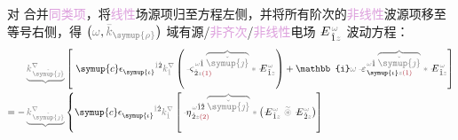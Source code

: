 对  合并\textcolor{Plum}{同类项}，将\textcolor{Plum}{线性}场源项归至方程左侧，并将所有阶次的\textcolor{Plum}{非线性}波源项移至等号右侧，得 $\left( \mathcolor{gray}{\omega}, \mathcolor{gray}{\bar{k}_{\symup{\rho}}} \right)$ 域\textcolor{NavyBlue}{有源}/\textcolor{Plum}{非齐次}/\textcolor{Plum}{非线性}电场 $\Xint{\mathcolor{gray}{-}}{295}{E}^{\;\!\mathcolor{gray}{\omega}}_{\;\! \hat{1} \mathcolor{gray}{z}}$ 波动方程：
\begin{subequations}
	\belowdisplayskip=3pt
\begin{align}
	&\mathcolor{gray}{\underbrace{k^\nabla_{\;\! \check{\symup{\jmath}}}}} \left[~ {\symup{c}} \epsilon^{\hphantom{\symup{\iota}}\mathcolor{gray}{\dot{1}}\dot{2}}_{\symup{\iota}} \mathcolor{gray}{k^\nabla_{\dot{1}}} \left( \Xint{\begin{smallmatrix} ~ \\ {}^{}_{\mathcolor{gray}{-}} \\ ~ \end{smallmatrix}}{13}{\varsigma}^{\;\! \mathcolor{gray}{\omega} \hat{1} \;\! \mathcolor{gray}{\overbrace{\check{\symup{\jmath}}}}}_{\;\! \dot{2} \mathcolor{gray}{z} \textcolor{Maroon}{(1)}} \mathcolor{gray}{*} \Xint{\mathcolor{gray}{-}}{295}{E}^{\;\!\mathcolor{gray}{\omega}}_{\;\! \hat{1} \mathcolor{gray}{z}} \right) + \mathbb{i} \mathcolor{gray}{\omega} \Xint{\begin{smallmatrix} ~ \\ {}^{}_{\mathcolor{gray}{-}} \\ ~ \end{smallmatrix}}{16}{\varepsilon}^{\;\! \mathcolor{gray}{\omega} \hat{1} \;\! \mathcolor{gray}{\overbrace{\check{\symup{\jmath}}}}}_{\;\! \symup{\iota} \mathcolor{gray}{z} \textcolor{Maroon}{(1)}} \mathcolor{gray}{*} \Xint{\mathcolor{gray}{-}}{295}{E}^{\;\!\mathcolor{gray}{\omega}}_{\;\! \hat{1} \mathcolor{gray}{z}} \right]  \label{eq:nonlinear-wave_wkrho} \\ = - &\mathcolor{gray}{\underbrace{k^\nabla_{\;\! \check{\symup{\jmath}}}}} \left\{ {\symup{c}} \epsilon^{\hphantom{\symup{\iota}}\mathcolor{gray}{\dot{1}}\dot{2}}_{\symup{\iota}} \mathcolor{gray}{k^\nabla_{\dot{1}}} \left[ \Xint{\begin{smallmatrix} ~ \\ {}^{}_{\mathcolor{gray}{-}} \\ ~ \end{smallmatrix}}{17}{\eta}^{\;\! \mathcolor{gray}{\omega} \hat{1} \hat{2} \;\! \mathcolor{gray}{\overbrace{\check{\symup{\jmath}}}}}_{\;\! \dot{2} \mathcolor{gray}{z} \textcolor{Maroon}{(2)}} \mathcolor{gray}{*} \left( \Xint{\mathcolor{gray}{-}}{295}{E}^{\;\!\mathcolor{gray}{\omega}}_{\;\! \hat{1} \mathcolor{gray}{z}} ~\mathcolor{gray}{\widetilde \circledast}~ \Xint{\mathcolor{gray}{-}}{295}{E}^{\;\!\mathcolor{gray}{\omega}}_{\;\! \hat{2} \mathcolor{gray}{z}} \right) \right] \right. \\ 

\end{align}
\end{subequations}
